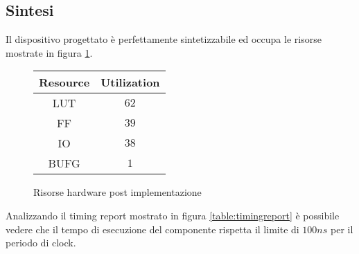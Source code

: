 \subsection{Sintesi}

Il dispositivo progettato è perfettamente sintetizzabile ed occupa le risorse mostrate in figura \ref{table:risorse}.

\begin{figure}[!ht]
    \centering
    \begin{tabular}{|c | c |}
        \hline
        Resource & Utilization \\
        \hline
        LUT      & $62$        \\
        \hline
        FF       & $39$        \\
        \hline
        IO       & $38$        \\
        \hline
        BUFG     & $1$         \\
        \hline
    \end{tabular}
    \caption{Risorse hardware post implementazione}
    \label{table:risorse}
\end{figure}

Analizzando il timing report mostrato in figura \ref{table:timingreport} è possibile vedere che il tempo di esecuzione del componente rispetta il limite di $100ns$ per il periodo di clock.

